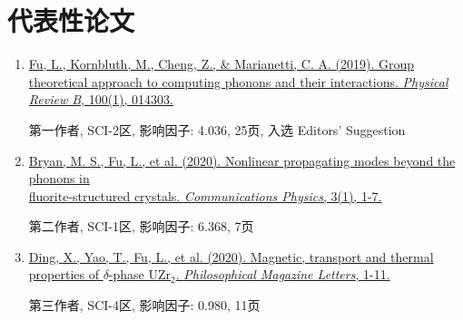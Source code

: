 \documentclass[
  a4paper,
  12pt
]{cv}
\begin{document}



\section{代表性论文}

\begin{enumerate}
\item
\href{https://doi.org/10.1103/PhysRevB.100.014303}
{\underline{Fu, L.}, Kornbluth, M., Cheng, Z., \& Marianetti, C. A. (2019). 
Group theoretical approach to computing phonons and their interactions. 
\textit{Physical Review B}, 100(1), 014303.}

第一作者, SCI-2区, 影响因子: 4.036, 25页, 入选 Editors' Suggestion
%
\item
\href{https://doi.org/10.1038/s42005-020-00483-2}{
Bryan, M. S., \underline{Fu, L.}, et al. (2020). 
Nonlinear propagating modes beyond the phonons in \\fluorite-structured crystals.
\textit{Communications Physics}, 3(1), 1-7.}

第二作者, SCI-1区, 影响因子: 6.368, 7页
%
\item
\href{https://doi.org/10.1080/09500839.2020.1833375}{
Ding, X., Yao, T., \underline{Fu, L.}, et al. (2020).
Magnetic, transport and thermal properties of $\delta$-phase UZr$_{2}$.
\textit{Philosophical Magazine Letters}, 1-11.}

第三作者, SCI-4区, 影响因子: 0.980, 11页
%
%
%
%
%


\end{enumerate}
\end{document}
